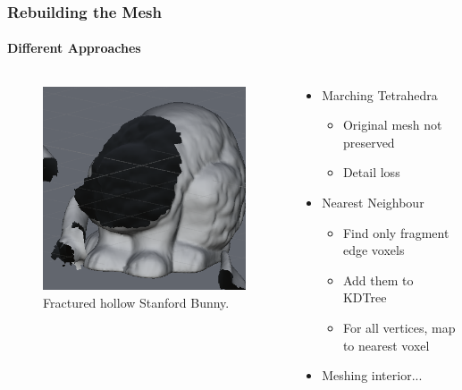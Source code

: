 \documentclass{beamer}
\begin{document}
	\begin{frame}
	\frametitle{Rebuilding the Mesh}
	\framesubtitle{Different Approaches}
		\begin{columns}[T] %
			\begin{column}[T]{5cm} %
				\begin{figure}
					\centerline{\includegraphics[scale=0.5]{Porcelain2.png}}
					\caption{Fractured hollow Stanford Bunny.}
				\end{figure}
			\end{column}
			\begin{column}[T]{5cm} %
				\begin{itemize}
				\item{Marching Tetrahedra}
					\begin{itemize}
						\item{Original mesh not preserved}
						\item{Detail loss}
					\end{itemize}
				\item{Nearest Neighbour}
					\begin{itemize}
						\item{Find only fragment edge voxels}
						\item{Add them to KDTree}
						\item{For all vertices, map to nearest voxel}
					\end{itemize}
				\item{Meshing interior...}
				\end{itemize}
			\end{column}
		\end{columns}
	\end{frame}
\end{document}
